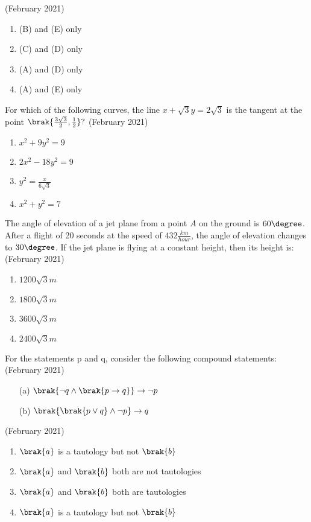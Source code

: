     \hfill{(February 2021)}
    \begin{enumerate}
    \item (B) and (E) only
    \item (C) and (D) only
    \item (A) and (D) only
    \item (A) and (E) only
    \end{enumerate}
\item For which of the following curves, the line $x + \sqrt{3}y = 2\sqrt{3} $ is the tangent at the point $\brak{\frac{3\sqrt{3}}{2}, \frac{1}{2}}?$
\hfill{(February 2021)} 
\begin{enumerate}
    \item $x^2+9y^2=9$
    \item $2x^2-18y^2=9$
    \item $y^2=\frac{x}{6\sqrt{3}}$
    \item $x^2+y^2=7$
\end{enumerate}
\item The angle of elevation of a jet plane from a point $A$ on the ground is $60\degree$. After a flight of 20 seconds at the speed of $432 \frac{km}{hour}$, the angle of elevation changes to $30\degree$. If the jet plane is flying at a constant height, then its height is:
\hfill{(February 2021)} 
\begin{enumerate}
    \item $1200\sqrt{3}m$
    \item $1800\sqrt{3}m$
    \item $3600\sqrt{3}m$
    \item $2400\sqrt{3}m$
\end{enumerate}
\item For the statements p and q, consider the following compound statements:
\hfill{(February 2021)} 
\begin{enumerate}
    \item[(a)] $\brak{\neg q \land \brak{p \rightarrow q}} \rightarrow \neg p $
    \item[(b)] $\brak{\brak{p \lor q} \land \neg p}\rightarrow q$
\end{enumerate}
\hfill{(February 2021)} 
\begin{enumerate}
    \item $\brak{a}$ is a tautology but not $\brak{b}$
    \item $\brak{a}$ and $\brak{b}$ both are not tautologies
    \item $\brak{a}$ and $\brak{b}$ both are tautologies
    \item $\brak{a}$ is a tautology but not $\brak{b}$
\end{enumerate}
 
